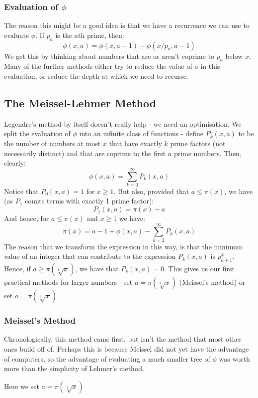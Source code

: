 \documentclass[12pt]{article}
\begin{document}
\subsubsection{Evaluation of $\phi$}
The reason this might be a good idea is that we have a recurrence we can use to evaluate $\phi$. If $p_a$ is the
$a$th prime, then:
\begin{equation}
\label{eq:phi-recurrence}
\phi(x,a) = \phi(x, a-1) - \phi(x/p_a, a-1)
\end{equation}
We get this by thinking about numbers that are or aren't coprime to $p_a$ below $x$. Many of the further methods
either try to reduce the value of $a$ in this evaluation, or reduce the depth at which we need to recurse.

\subsection{The Meissel-Lehmer Method}
Legendre's method by itself doesn't really help - we need an optimisation. We split the evaluation of $\phi$ into an
infinite class of functions - define $P_k(x, a)$ to be the number of numbers at most $x$ that have exactly $k$ prime
factors (not necessarily distinct) and that are coprime to the first $a$ prime numbers. Then, clearly:
$$\phi(x,a) = \sum_{k=0}^{\infty}P_k(x,a)$$
Notice that $P_0(x,a)=1$ for $x\geq1$.
But also, provided that $a\leq\pi(x)$, we have (as $P_1$ counts terms with exactly 1 prime factor):
$$P_1(x,a)=\pi(x) - a$$
And hence, for $a\leq\pi(x)$ and $x\geq1$ we have:
$$\pi(x) = a - 1 + \phi(x,a) - \sum_{k=2}^{\infty}P_k(x,a)$$
The reason that we transform the expression in this way, is that the minimum value of an integer that can
contribute to the expression $P_k(x,a)$ is $p_{a+1}^k$. Hence, if $a\geq\pi\left(\sqrt[k]{x}\right)$, we have
that $P_k(x,a) = 0$. This gives us our first practical methods for larger numbers - set $a=\pi\left(\sqrt[4]{x}\right)$
(Meissel's method) or set $a=\pi\left(\sqrt[3]{x}\right)$.

\subsubsection{Meissel's Method}
Chronologically, this method came first, but isn't the method that most other ones build off of. Perhaps this
is because Meissel did not yet have the advantage of computers, so the advantage of evaluating a much smaller
tree of $\phi$ was worth more than the simplicity of Lehmer's method.

Here we set $a=\pi\left(\sqrt[4]{x}\right)$
\end{document}
